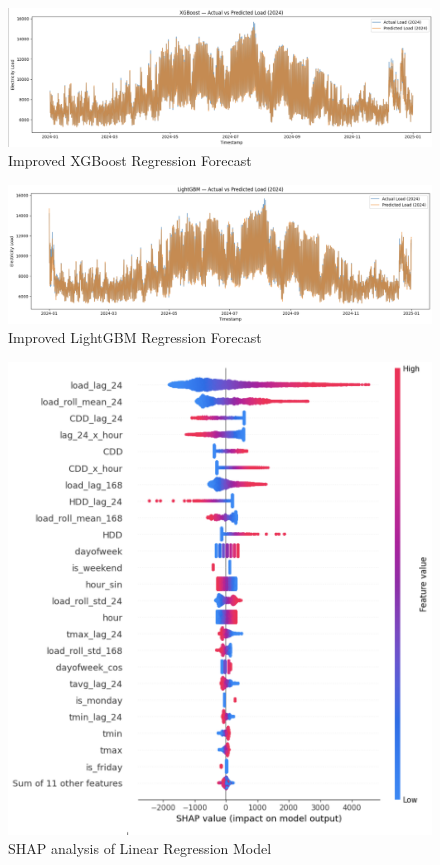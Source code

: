 \documentclass{ifacconf}
\begin{document}
\begin{figure}[htbp]
    \centering
    \includegraphics[width=1.05\textwidth]{boost.png} 
    \caption{Improved XGBoost Regression Forecast}
    \label{fig:load_patterns}
\end{figure}

\begin{figure}[htbp]
    \centering
    \includegraphics[width=1.05\textwidth]{lightgbmimproved.png} 
    \caption{Improved LightGBM Regression Forecast}
    \label{fig:load_patterns}
\end{figure}

\clearpage

\clearpage
\begin{figure}[htbp]
    \centering
    \includegraphics[width=1\linewidth]{shaplinear.png} 
    \caption{SHAP analysis of Linear Regression Model}
    \label{fig:load_patterns3}
\end{figure}
\end{document}
